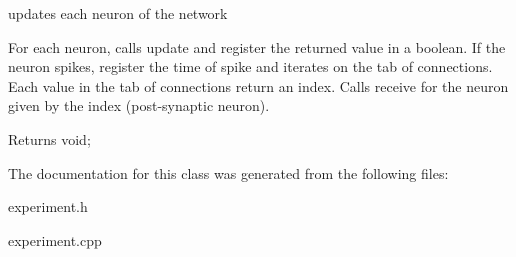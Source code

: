 updates each neuron of the network 

For each neuron, calls update and register the returned value in a boolean. If the neuron spikes, register the time of spike and iterates on the tab of connections. Each value in the tab of connections return an index. Calls receive for the neuron given by the index (post-\/synaptic neuron). \begin{DoxyReturn}{Returns}
void; 
\end{DoxyReturn}


The documentation for this class was generated from the following files\-:\begin{DoxyCompactItemize}
\item 
experiment.\-h\item 
experiment.\-cpp\end{DoxyCompactItemize}
